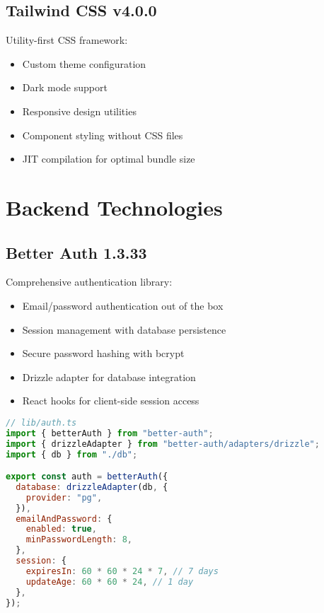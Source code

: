 \documentclass[12pt,a4paper]{report}
\begin{document}
\subsection{Tailwind CSS v4.0.0}

Utility-first CSS framework:
\begin{itemize}
    \item Custom theme configuration
    \item Dark mode support
    \item Responsive design utilities
    \item Component styling without CSS files
    \item JIT compilation for optimal bundle size
\end{itemize}

\section{Backend Technologies}

\subsection{Better Auth 1.3.33}

Comprehensive authentication library:

\begin{itemize}
    \item Email/password authentication out of the box
    \item Session management with database persistence
    \item Secure password hashing with bcrypt
    \item Drizzle adapter for database integration
    \item React hooks for client-side session access
\end{itemize}

\begin{lstlisting}[language=JavaScript, caption=Better Auth Configuration]
// lib/auth.ts
import { betterAuth } from "better-auth";
import { drizzleAdapter } from "better-auth/adapters/drizzle";
import { db } from "./db";

export const auth = betterAuth({
  database: drizzleAdapter(db, {
    provider: "pg",
  }),
  emailAndPassword: {
    enabled: true,
    minPasswordLength: 8,
  },
  session: {
    expiresIn: 60 * 60 * 24 * 7, // 7 days
    updateAge: 60 * 60 * 24, // 1 day
  },
});
\end{lstlisting}
\end{document}
